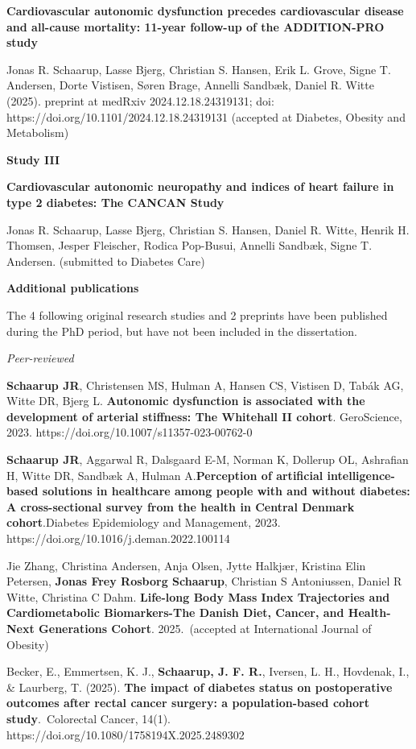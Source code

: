 \documentclass[
  a4paper,
  headsepline=true,
  open=any]{scrbook}
\begin{document}
\textbf{Cardiovascular autonomic dysfunction precedes cardiovascular
disease and all-cause mortality: 11-year follow-up of the ADDITION-PRO
study}

Jonas R. Schaarup, Lasse Bjerg, Christian S. Hansen, Erik L. Grove,
Signe T. Andersen, Dorte Vistisen, Søren Brage, Annelli Sandbæk, Daniel
R. Witte (2025). preprint at medRxiv 2024.12.18.24319131; doi:
https://doi.org/10.1101/2024.12.18.24319131 (accepted at Diabetes,
Obesity and Metabolism)

\textbf{Study III}

\textbf{Cardiovascular autonomic neuropathy and indices of heart failure
in type 2 diabetes: The CANCAN Study}

Jonas R. Schaarup, Lasse Bjerg, Christian S. Hansen, Daniel R. Witte,
Henrik H. Thomsen, Jesper Fleischer, Rodica Pop-Busui, Annelli Sandbæk,
Signe T. Andersen. (submitted to Diabetes Care)

\newpage

\textbf{Additional publications}

The 4 following original research studies and 2 preprints have been
published during the PhD period, but have not been included in the
dissertation.

\emph{Peer-reviewed}

\textbf{Schaarup JR}, Christensen MS, Hulman A, Hansen CS, Vistisen D,
Tabák AG, Witte DR, Bjerg L. \textbf{Autonomic dysfunction is associated
with the development of arterial stiffness: The Whitehall II cohort}.
GeroScience, 2023. https://doi.org/10.1007/s11357-023-00762-0

\textbf{Schaarup JR}, Aggarwal R, Dalsgaard E-M, Norman K, Dollerup OL,
Ashrafian H, Witte DR, Sandbæk A, Hulman A.\textbf{Perception of
artificial intelligence-based solutions in healthcare among people with
and without diabetes: A cross-sectional survey from the health in
Central Denmark cohort}.Diabetes Epidemiology and Management, 2023.
https://doi.org/10.1016/j.deman.2022.100114

Jie Zhang, Christina Andersen, Anja Olsen, Jytte Halkjær, Kristina Elin
Petersen, \textbf{Jonas Frey Rosborg Schaarup}, Christian S Antoniussen,
Daniel R Witte, Christina C Dahm. \textbf{Life-long Body Mass Index
Trajectories and Cardiometabolic Biomarkers-The Danish Diet, Cancer, and
Health-Next Generations Cohort}. 2025.~(accepted at International
Journal of Obesity)

Becker, E., Emmertsen, K. J., \textbf{Schaarup, J. F. R.}, Iversen, L.
H., Hovdenak, I., \& Laurberg, T. (2025). \textbf{The impact of diabetes
status on postoperative outcomes after rectal cancer surgery: a
population-based cohort study}.~Colorectal Cancer, 14(1).
https://doi.org/10.1080/1758194X.2025.2489302
\end{document}
